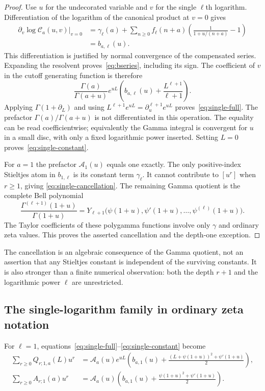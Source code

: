 \documentclass[11pt,oneside]{article}
\numberwithin{equation}{section}
\theoremstyle{definition}
\theoremstyle{remark}
\newcommand{\CC}{\mathcal C}
\newcommand{\Acal}{\mathcal A}
\begin{document}
\begin{proof}
Use $u$ for the undecorated variable and $v$ for the single $\ell$th logarithm.
Differentiation of the logarithm of the canonical product at $v=0$ gives
\begin{align*}
\left.\partial_v\log\CC_a(u,v)\right|_{v=0}
 &=\gamma_\ell(a)+\sum_{n\ge0}f_\ell(n+a)
             \left(\frac1{1+u/(n+a)}-1\right)\\
 &=b_{a,\ell}(u).
\end{align*}
This differentiation is justified by normal convergence of the compensated
series. Expanding the resolvent proves~\eqref{eq:bseries}, including its sign.
The coefficient of $v$ in the cutoff generating function is therefore
\[
\frac{\Gamma(a)}{\Gamma(a+u)}e^{uL}
 \left(b_{a,\ell}(u)+\frac{L^{\ell+1}}{\ell+1}\right).
\]
Applying $\Gamma(1+\partial_L)$ and using
$L^{\ell+1}e^{uL}=\partial_u^{\ell+1}e^{uL}$ proves~\eqref{eq:single-full}.
The prefactor $\Gamma(a)/\Gamma(a+u)$ is not differentiated in this operation.
The equality can be read coefficientwise; equivalently the Gamma integral
is convergent for $u$ in a small disc, with only a fixed logarithmic power
inserted. Setting $L=0$ proves~\eqref{eq:single-constant}.

For $a=1$ the prefactor $\Acal_1(u)$ equals one exactly. The only
positive-index Stieltjes atom in $b_{1,\ell}$ is its constant term
$\gamma_\ell$. It cannot contribute to $[u^r]$ when $r\ge1$, giving
\eqref{eq:single-cancellation}. The remaining Gamma quotient is the complete
Bell polynomial
\[
\frac{\Gamma^{(\ell+1)}(1+u)}{\Gamma(1+u)}
=Y_{\ell+1}\bigl(\psi(1+u),\psi'(1+u),\ldots,\psi^{(\ell)}(1+u)\bigr).
\]
The Taylor coefficients of these polygamma functions involve only $\gamma$
and ordinary zeta values. This proves the asserted cancellation and the
depth-one exception.
\end{proof}

The cancellation is an algebraic consequence of the Gamma quotient, not an
assertion that any Stieltjes constant is independent of the surviving
constants. It is also stronger than a finite numerical observation: both the
depth $r+1$ and the logarithmic power $\ell$ are unrestricted.

\subsection{The single-logarithm family in ordinary zeta notation}

For $\ell=1$, equations~\eqref{eq:single-full}--\eqref{eq:single-constant}
become
\begin{align}
\sum_{r\ge0}Q_{r;1,a}(L)u^r
 &=\Acal_a(u)e^{uL}
  \left(b_{a,1}(u)+\frac{(L+\psi(1+u))^2+\psi'(1+u)}2\right),
  \label{eq:one-log-full}\\
\sum_{r\ge0}A_{r;1}(a)u^r
 &=\Acal_a(u)
  \left(b_{a,1}(u)+\frac{\psi(1+u)^2+\psi'(1+u)}2\right).
  \label{eq:one-log-constant}
\end{align}
\end{document}
